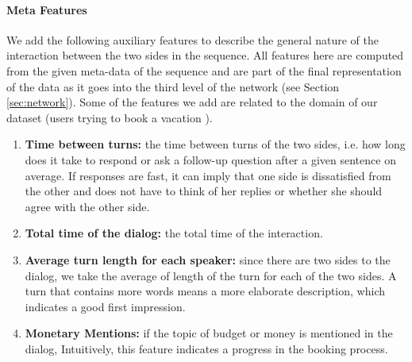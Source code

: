 


\paragraph*{Meta Features}
We add the following auxiliary features 
to describe the general nature 
of the interaction between the two sides 
in the sequence. All features here 
are computed from the given meta-data of the sequence and 
are part of the final representation of the data as it goes into the 
third level of the network (see Section \ref{sec:network}). 
Some of the features we add are related to the domain of our dataset 
(users trying to book a vacation \cite{frames}).

\begin{enumerate}
\item {\bf Time between turns: } the time between 
turns of the two sides, i.e. how long does it take to respond or ask a follow-up 
question after a given sentence on average. 
If responses are fast, it can imply that one side is dissatisfied 
from the other and does not have to think of her replies or whether 
she should agree with the other side.\label{itm:between}

\item {\bf Total time of the dialog: } the total time of the interaction. \label{itm:total}

\item {\bf Average turn length for each speaker: } since there are two sides to the dialog, 
we take the average of length of the turn for each of the two sides. 
A turn that contains more words means a more elaborate description, which indicates 
a good first impression.\label{itm:sent}


\item {\bf Monetary Mentions: } if the topic of budget or money is mentioned in the dialog, 
Intuitively, this feature indicates a progress in the booking process.\label{itm:budget}

\end{enumerate} 

